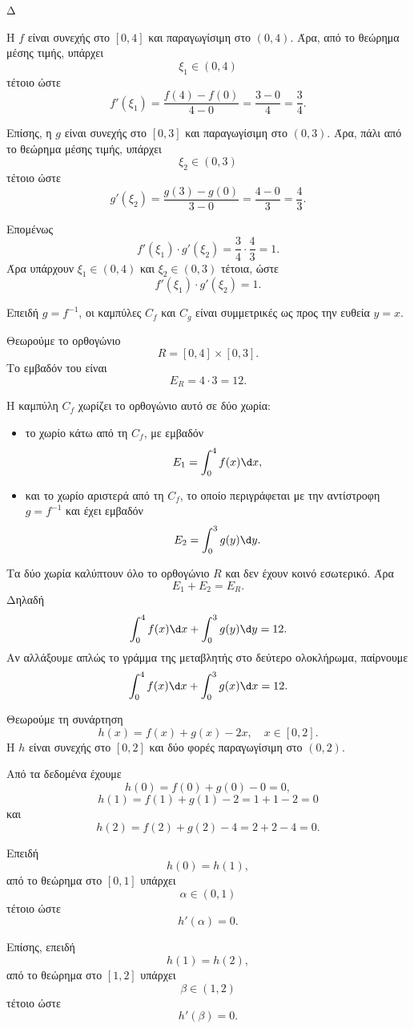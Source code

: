 \begin{thema}{Δ}
\begin{erwthma}
\item Η $f$ είναι συνεχής στο $[0,4]$ και παραγωγίσιμη στο $(0,4)$.
Άρα, από το θεώρημα μέσης τιμής, υπάρχει
\[
\xi_1\in(0,4)
\]
τέτοιο ώστε
\[
f'(\xi_1)=\frac{f(4)-f(0)}{4-0}
=\frac{3-0}{4}
=\frac34.
\]

Επίσης, η $g$ είναι συνεχής στο $[0,3]$ και παραγωγίσιμη στο $(0,3)$.
Άρα, πάλι από το θεώρημα μέσης τιμής, υπάρχει
\[
\xi_2\in(0,3)
\]
τέτοιο ώστε
\[
g'(\xi_2)=\frac{g(3)-g(0)}{3-0}
=\frac{4-0}{3}
=\frac43.
\]

Επομένως
\[
f'(\xi_1)\cdot g'(\xi_2)
=\frac34\cdot\frac43
=1.
\]
Άρα υπάρχουν $\xi_1 \in (0,4)$ και $\xi_2\in(0,3)$ τέτοια, ώστε
\[
{f'(\xi_1)\cdot g'(\xi_2)=1}.
\]

\item Επειδή $g=f^{-1}$, οι καμπύλες $C_f$ και $C_g$ είναι συμμετρικές
ως προς την ευθεία $y=x$.

Θεωρούμε το ορθογώνιο
\[
R=[0,4]\times[0,3].
\]
Το εμβαδόν του είναι
\[
E_R=4\cdot 3=12.
\]

Η καμπύλη $C_f$ χωρίζει το ορθογώνιο αυτό σε δύο χωρία:
\begin{itemize}
\item το χωρίο κάτω από τη $C_f$, με εμβαδόν
\[
E_1=\int_0^4 f(x)\d x,
\]
\item και το χωρίο αριστερά από τη $C_f$, το οποίο περιγράφεται με την
αντίστροφη $g=f^{-1}$ και έχει εμβαδόν
\[
E_2=\int_0^3 g(y)\d y.
\]
\end{itemize}
Τα δύο χωρία καλύπτουν όλο το ορθογώνιο $R$ και δεν έχουν κοινό
εσωτερικό. Άρα
\[
E_1+E_2=E_R.
\]
Δηλαδή
\[
\int_0^4 f(x)\d x+\int_0^3 g(y)\d y=12.
\]
Αν αλλάξουμε απλώς το γράμμα της μεταβλητής στο δεύτερο ολοκλήρωμα,
παίρνουμε
\[
{\int_0^4 f(x)\d x+\int_0^3 g(x)\d x=12}.
\]

\item Θεωρούμε τη συνάρτηση
\[
h(x)=f(x)+g(x)-2x,\quad x\in[0,2].
\]
Η $h$ είναι συνεχής στο $[0,2]$ και δύο φορές παραγωγίσιμη στο $(0,2)$.

Από τα δεδομένα έχουμε
\[
h(0)=f(0)+g(0)-0=0,
\]
\[
h(1)=f(1)+g(1)-2=1+1-2=0
\]
και
\[
h(2)=f(2)+g(2)-4=2+2-4=0.
\]

Επειδή
\[
h(0)=h(1),
\]
από το θεώρημα  στο $[0,1]$ υπάρχει
\[
\alpha\in(0,1)
\]
τέτοιο ώστε
\[
h'(\alpha)=0.
\]

Επίσης, επειδή
\[
h(1)=h(2),
\]
από το θεώρημα  στο $[1,2]$ υπάρχει
\[
\beta\in(1,2)
\]
τέτοιο ώστε
\[
h'(\beta)=0.
\]


\end{erwthma}
\end{thema}
